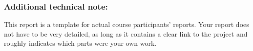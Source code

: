 \documentclass[12pt]{article}
\begin{document}

\subsubsection*{Additional technical note:}
This report is a template for actual course participants' reports. Your report does not have to be very detailed, as long as it contains a clear link to the project and roughly indicates which parts were your own work.
\end{document}
